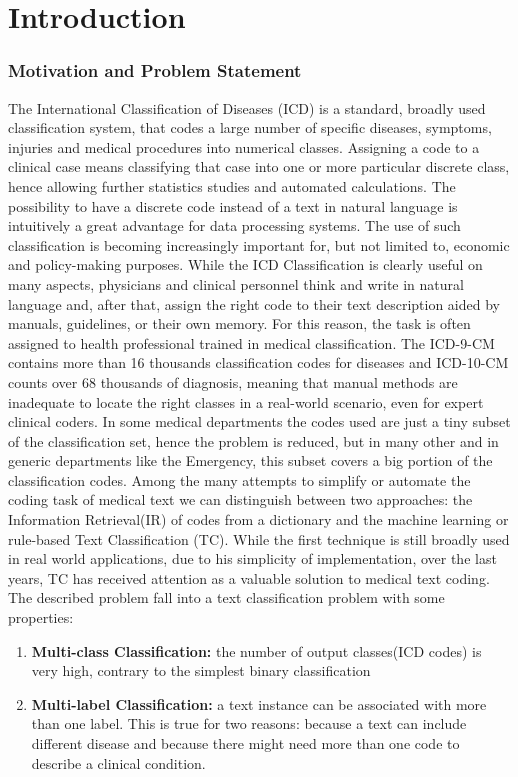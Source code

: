 \chapter{Introduction}

\subsection{Motivation and Problem Statement}
The International Classification of Diseases (ICD) is a standard, broadly used classification system, that codes a large number of specific diseases, symptoms, injuries and medical procedures into numerical classes. Assigning a code to a clinical case means classifying that case into one or more particular discrete class, hence allowing further statistics studies and automated calculations. The possibility to have a discrete code instead of a text in natural language is intuitively a great advantage for data processing systems. The use of such classification is becoming increasingly important for, but not limited to, economic and policy-making purposes.
While the ICD Classification is clearly useful on many aspects, physicians and clinical personnel think and write in natural language and, after that, assign the right code to their text description aided by manuals, guidelines, or their own memory. For this reason, the task is often assigned to health professional trained in medical classification.
The ICD-9-CM contains more than 16 thousands classification codes for diseases and ICD-10-CM counts over 68 thousands of diagnosis, meaning that manual methods are inadequate to locate the right classes in a real-world scenario, even for expert clinical coders. In some medical departments the codes used are just a tiny subset of the classification set, hence the problem is reduced, but in
many other and in generic departments like the Emergency, this subset covers a big portion of the classification codes.
Among the many attempts to simplify or automate the coding task of medical text we can distinguish between two approaches: the Information Retrieval(IR) of codes from a dictionary and the machine learning or rule-based Text Classification (TC).
While the first technique is still broadly used in real world applications, due to his simplicity of implementation, over the last years, TC has received attention as a valuable solution to medical text coding.\cite{crammer2007automatic} \\
The described problem fall into a text classification problem with some properties:
\begin{enumerate}
	\item \textbf{Multi-class Classification:} the number of output classes(ICD codes) is very high, contrary to the simplest binary classification
	\item \textbf{Multi-label Classification:} a text instance can be associated with more than one label. This is true for two reasons: because a text can include different disease and because there might need more than one code to describe a clinical condition.
\end{enumerate}
